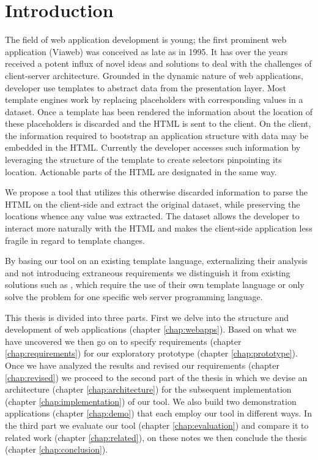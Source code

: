 \documentclass[thesis.tex]{subfiles}
\begin{document}
\chapter{Introduction}
\label{chap:intro}
The field of web application development is young; the first prominent
web application (Viaweb) was conceived as late as in 1995.
It has over the years received a potent influx of novel ideas and solutions
to deal with the challenges of client-server architecture.
Grounded in the dynamic nature of web applications, developer use templates to
abstract data from the presentation layer.
Most template engines work by replacing placeholders with corresponding values
in a dataset.
Once a template has been rendered the information about the location of these
placeholders is discarded and the HTML is sent to the client.
On the client, the information required to bootstrap an application structure
with data may be embedded in the HTML. Currently the developer accesses such
information by leveraging the structure of the template to create selectors
pinpointing its location. Actionable parts of the HTML are designated in the
same way.

We propose a tool that utilizes this otherwise discarded information to parse
the HTML on the client-side and extract the original dataset, while preserving
the locations whence any value was extracted. The dataset allows the developer
to interact more naturally with the HTML and makes the client-side application
less fragile in regard to template changes.

By basing our tool on an existing template language, externalizing their
analysis and not introducing extraneous requirements we distinguish it from
existing solutions such as \todo{},
which require the use of their own template language or only solve the problem
for one specific web server programming language.


This thesis is divided into three parts. First we delve into the structure
and development of web applications (chapter \ref{chap:webapps}).
Based on what we have uncovered we then go on to specify
requirements (chapter \ref{chap:requirements}) for our
exploratory prototype (chapter \ref{chap:prototype}).
Once we have analyzed the results and revised our
requirements (chapter \ref{chap:revised}) we proceed to the second part of the
thesis in which we devise an architecture (chapter \ref{chap:architecture}) for
the subsequent implementation (chapter \ref{chap:implementation}) of our tool.
We also build two demonstration applications (chapter \ref{chap:demo}) that each
employ our tool in different ways.
In the third part we evaluate our tool (chapter \ref{chap:evaluation}) and
compare it to related work (chapter \ref{chap:related}), on these notes we then
conclude the thesis (chapter \ref{chap:conclusion}).
\end{document}
